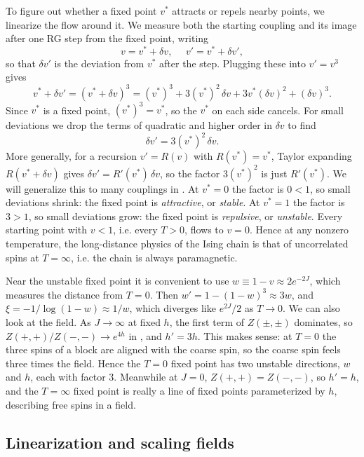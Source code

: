 To figure out whether a fixed point $v^*$ attracts or repels nearby points, we
linearize the flow around it. We measure both the starting coupling and its
image after one RG step from the fixed point, writing
\begin{equation}
  v=v^*+\delta v,~~~~~~v'=v^*+\delta v',
\end{equation}
so that $\delta v'$ is the deviation from $v^*$ after the step. Plugging these
into $v'=v^3$ gives
\begin{equation}
  v^*+\delta v'=(v^*+\delta v)^3
  =(v^*)^3+3(v^*)^2\,\delta v+3v^*(\delta v)^2+(\delta v)^3.
\end{equation}
Since $v^*$ is a fixed point, $(v^*)^3=v^*$, so the $v^*$ on each side cancels.
For small deviations we drop the terms of quadratic and higher order in
$\delta v$ to find
\begin{equation}
  \delta v'=3(v^*)^2\,\delta v.
\end{equation}
More generally, for a recursion $v'=R(v)$ with $R(v^*)=v^*$, Taylor expanding
$R(v^*+\delta v)$ gives $\delta v'=R'(v^*)\,\delta v$, so the factor $3(v^*)^2$
is just $R'(v^*)$. We will generalize this to many couplings in
.
At $v^*=0$ the factor is $0<1$, so small deviations shrink: the fixed point
is {\it attractive}, or {\it stable}. At $v^*=1$ the factor is $3>1$, so small
deviations grow: the fixed point is {\it repulsive}, or {\it unstable}. Every
starting point with $v<1$, i.e. every $T>0$, flows to $v=0$. Hence at any
nonzero temperature, the long-distance physics of the  Ising chain is that
of uncorrelated spins at $T=\infty$, i.e. the chain is always paramagnetic.

Near the unstable fixed point it is convenient to use $w\equiv1-v\approx2e^{-2J}$,
which measures the distance from $T=0$. Then $w'=1-(1-w)^3\approx3w$, and
$\xi=-1/\log(1-w)\approx1/w$, which diverges like $e^{2J}/2$ as $T\to0$. We can
also look at the field. As $J\to\infty$ at fixed $h$, the first term of
$Z(\pm,\pm)$ dominates, so $Z(+,+)/Z(-,-)\to e^{4h}$ in ,
and $h'=3h$. This makes sense: at $T=0$ the three spins of a block are aligned
with the coarse spin, so the coarse spin feels three times the field.
Hence the $T=0$ fixed point has two unstable directions, $w$ and $h$, each
with factor $3$. Meanwhile at $J=0$, $Z(+,+)=Z(-,-)$, so $h'=h$, and
the $T=\infty$ fixed point is really a line of fixed points parameterized by $h$,
describing free spins in a field.

\subsection{Linearization and scaling fields}\label{sec:scalingFields}

